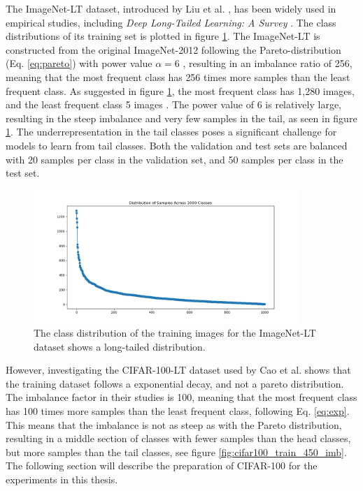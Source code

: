 \noindent The ImageNet-LT dataset, introduced by Liu et al. \cite{liu2019largescalelongtailedrecognitionopen}, has been widely used in empirical studies, including \textit{Deep Long-Tailed Learning: A Survey} \cite{zhang2023deep}. The class distributions of its training set is plotted in figure \ref{fig:IN-train}. The ImageNet-LT is constructed from the original ImageNet-2012 following the Pareto-distribution (Eq. \eqref{eq:pareto}) with power value $\alpha=6$ \cite{liu2019largescalelongtailedrecognitionopen}, resulting in an imbalance ratio of 256, meaning that the most frequent class has 256 times more samples than the least frequent class. As suggested in figure \ref{fig:IN-train}, the most frequent class has 1,280 images, and the least frequent class 5 images \cite{liu2019largescalelongtailedrecognitionopen}. The power value of 6 is relatively large, resulting in the steep imbalance and very few samples in the tail, as seen in figure \ref{fig:IN-train}. The underrepresentation in the tail classes poses a significant challenge for models to learn from tail classes. Both the validation and test sets are balanced with 20 samples per class in the validation set, and 50 samples per class in the test set. 


\begin{figure}[h!]
    \centering
    \includegraphics[width=0.9\textwidth]{Images/Plots/class_distribution_train.png}
    \caption{The class distribution of the training images for the ImageNet-LT dataset shows a long-tailed distribution.}
    \label{fig:IN-train}
\end{figure}


However, investigating the CIFAR-100-LT dataset used by Cao et al. \cite{cao2019learningimbalanceddatasetslabeldistributionaware} shows that the training dataset follows a exponential decay, and not a pareto distribution. The imbalance factor in their studies is 100, meaning that the most frequent class has 100 times more samples than the least frequent class, following Eq. \eqref{eq:exp}. This means that the imbalance is not as steep as with the Pareto distribution, resulting in a middle section of classes with fewer samples than the head classes, but more samples than the tail classes, see figure \ref{fig:cifar100_train_450_imb}. The following section will describe the preparation of CIFAR-100 for the experiments in this thesis.


